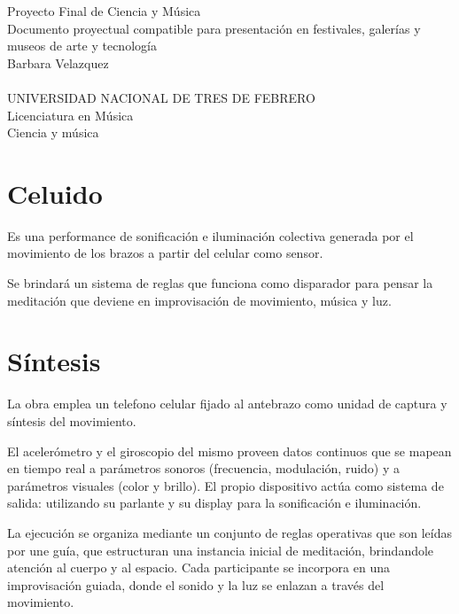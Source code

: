 \documentclass[spanish]{report}
\newcommand{\fechaHoy}{\DTMdisplaydate{\year}{\month}{\day}{-1}}
\newcommand{\sectionsep}{1cm}
\newcommand{\tituloDocumento}{Proyecto Final de Ciencia y Música}
\newcommand{\subtitulo}{Documento proyectual compatible para presentación en festivales, galerías y museos de arte y tecnología}
\newcommand{\autor}{Barbara Velazquez}
\newcommand{\catedra}{Ciencia y música}
\newcommand{\carrera}{Licenciatura en Música}
\newcommand{\universidad}{UNIVERSIDAD NACIONAL DE TRES DE FEBRERO}
\begin{document}


\begin{center}
    {\Large \tituloDocumento}\\[0.5cm]
    {\large \subtitulo}\\[0.5cm]
    {\large \autor}\\[0.3cm]
    {\small \fechaHoy}\\[1cm]
    {\large \universidad}\\
    {\large \carrera}\\
    {\large \catedra}
\end{center}

\thispagestyle{empty}
\clearpage
\pagestyle{fancy}

\clearpage
\thispagestyle{empty}
\renewcommand{\contentsname}{Índice}
\setcounter{tocdepth}{2}
\tableofcontents
\clearpage

\vspace{\sectionsep}
\vspace{\sectionsep}
\section{Celuido}
Es una performance de sonificación e iluminación colectiva generada por el movimiento de los brazos a partir del celular como sensor.

Se brindará un sistema de reglas que funciona como disparador para pensar la meditación que deviene en improvisación de movimiento, música y luz.  

\vspace{\sectionsep}
\section{Síntesis}
La obra emplea un telefono celular fijado al antebrazo como unidad de captura y síntesis del movimiento. 

El acelerómetro y el giroscopio del mismo proveen datos continuos que se mapean en tiempo real a parámetros sonoros (frecuencia, modulación, ruido) y a parámetros visuales (color y brillo). El propio dispositivo actúa como sistema de salida: utilizando su parlante y su display para la sonificación e iluminación.

La ejecución se organiza mediante un conjunto de reglas operativas que son leídas por une guía, que estructuran una instancia inicial de meditación, brindandole atención al cuerpo y al espacio. Cada participante se incorpora en una improvisación guiada, donde el sonido y la luz se enlazan a través del movimiento.
\end{document}
